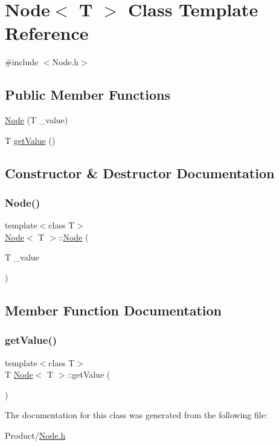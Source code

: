 \hypertarget{classNode}{}\section{Node$<$ T $>$ Class Template Reference}
\label{classNode}


{\ttfamily \#include $<$Node.\+h$>$}

\subsection*{Public Member Functions}
\begin{DoxyCompactItemize}
\item 
\mbox{\hyperlink{classNode_ab21d6b5819c46310ce96e24a1db978ec}{Node}} (T \+\_\+value)
\item 
T \mbox{\hyperlink{classNode_a8a9d6500c263a8338c1b763f44f8dadd}{get\+Value}} ()
\end{DoxyCompactItemize}


\subsection{Constructor \& Destructor Documentation}
\mbox{\label{classNode_ab21d6b5819c46310ce96e24a1db978ec}} 
\subsubsection{\texorpdfstring{Node()}{Node()}}
{\footnotesize\ttfamily template$<$class T$>$ \\
\mbox{\hyperlink{classNode}{Node}}$<$ T $>$\+::\mbox{\hyperlink{classNode}{Node}} (\begin{DoxyParamCaption}\item[{T}]{\+\_\+value }\end{DoxyParamCaption})}



\subsection{Member Function Documentation}
\mbox{\label{classNode_a8a9d6500c263a8338c1b763f44f8dadd}} 
\subsubsection{\texorpdfstring{getValue()}{getValue()}}
{\footnotesize\ttfamily template$<$class T$>$ \\
T \mbox{\hyperlink{classNode}{Node}}$<$ T $>$\+::get\+Value (\begin{DoxyParamCaption}{ }\end{DoxyParamCaption})}



The documentation for this class was generated from the following file\+:\begin{DoxyCompactItemize}
\item 
Product/\mbox{\hyperlink{Node_8h}{Node.\+h}}\end{DoxyCompactItemize}

